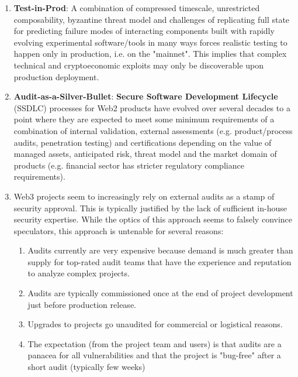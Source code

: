 \begin{enumerate}
\item\textbf{Test-in-Prod}: A combination of compressed timescale, unrestricted composability, byzantine threat model and challenges of replicating full state for predicting failure modes of interacting components built with rapidly evolving experimental software/tools in many ways forces realistic testing to happen only in production, i.e. on the "mainnet". This implies that complex technical and cryptoeconomic exploits may only be discoverable upon production deployment.

\item\textbf{Audit-as-a-Silver-Bullet}: \textbf{Secure Software Development Lifecycle} (SSDLC) processes for Web2 products have evolved over several decades to a point where they are expected to meet some minimum requirements of a combination of internal validation, external assessments (e.g. product/process audits, penetration testing) and certifications depending on the value of managed assets, anticipated risk, threat model and the market domain of products (e.g. financial sector has stricter regulatory compliance requirements).

\item Web3 projects seem to increasingly rely on external audits as a stamp of security approval. This is typically justified by the lack of sufficient in-house security expertise. While the optics of this approach seems to falsely convince speculators, this approach is untenable for several reasons:
\begin{enumerate}
\item Audits currently are very expensive because demand is much greater than supply for top-rated audit teams that have the experience and reputation to analyze complex projects.
\item Audits are typically commissioned once at the end of project development just before production release.
\item Upgrades to projects go unaudited for commercial or logistical reasons.
\item The expectation (from the project team and users) is that audits are a panacea for all vulnerabilities and that the project is "bug-free" after a short audit (typically few weeks)
\end{enumerate}

\end{enumerate}
